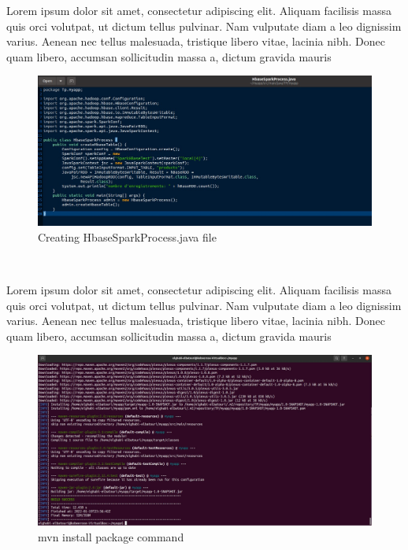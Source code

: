 \begin{spacing}{1.2}
\par Lorem ipsum dolor sit amet, consectetur adipiscing elit. Aliquam facilisis massa quis orci volutpat, ut dictum tellus pulvinar. Nam vulputate diam a leo dignissim varius. Aenean nec tellus malesuada, tristique libero vitae, lacinia nibh. Donec quam libero, accumsan sollicitudin massa a, dictum gravida mauris
\\
\begin{figure}[!htb] 
\begin{center} 
\includegraphics[width=1\linewidth]{Pictures/HBase/Data processing with Spark/Preparation of the environment/Creating HbaseSparkProcess.java file} 
\end{center} 
\caption{Creating HbaseSparkProcess.java file} 
\end{figure}  \FloatBarrier
\\

\par Lorem ipsum dolor sit amet, consectetur adipiscing elit. Aliquam facilisis massa quis orci volutpat, ut dictum tellus pulvinar. Nam vulputate diam a leo dignissim varius. Aenean nec tellus malesuada, tristique libero vitae, lacinia nibh. Donec quam libero, accumsan sollicitudin massa a, dictum gravida mauris
\\
\begin{figure}[!htb] 
\begin{center} 
\includegraphics[width=1\linewidth]{Pictures/HBase/Data processing with Spark/Preparation of the environment/mvn install package command} 
\end{center} 
\caption{mvn install package command} 
\end{figure}  \FloatBarrier
\\

\end{spacing}
